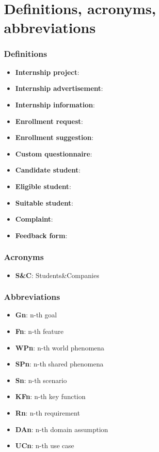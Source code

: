 \begin{enumerate}[label=\textbf{SP\arabic* -}]
\end{enumerate}

\section{Definitions, acronyms, abbreviations}

\subsubsection{Definitions}

\begin{itemize}
    \item \textbf{Internship project}: %
    \item \textbf{Internship advertisement}:
    \item \textbf{Internship information}:
    \item \textbf{Enrollment request}:
    \item \textbf{Enrollment suggestion}:
    \item \textbf{Custom questionnaire}:
    \item \textbf{Candidate student}:
    \item \textbf{Eligible student}:
    \item \textbf{Suitable student}:
    \item \textbf{Complaint}:
    \item \textbf{Feedback form}:
\end{itemize}

\subsubsection{Acronyms}

\begin{itemize}
    \item \textbf{S\&C}: Students\&Companies
\end{itemize}

\subsubsection{Abbreviations}

\begin{itemize}
    \item \textbf{Gn}: n-th goal
    \item \textbf{Fn}: n-th feature
    \item \textbf{WPn}: n-th world phenomena
    \item \textbf{SPn}: n-th shared phenomena
    \item \textbf{Sn}: n-th scenario
    \item \textbf{KFn}: n-th key function
    \item \textbf{Rn}: n-th requirement
    \item \textbf{DAn}: n-th domain assumption
    \item \textbf{UCn}: n-th use case
\end{itemize}

